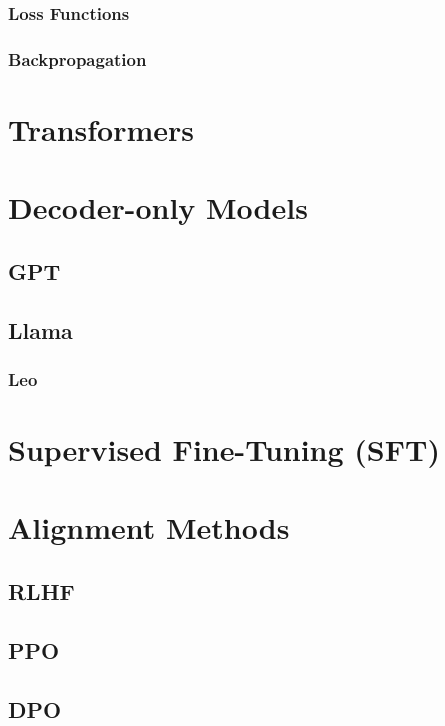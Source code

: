 \subsubsection{Loss Functions}

\subsubsection{Backpropagation}

\section{Transformers}\label{sec:trans}

\section{Decoder-only Models}\label{sec:decoder}

\subsection{GPT}\label{subsec:gpt}

\subsection{Llama}\label{subsec:llama}

\subsubsection{Leo}

\section{Supervised Fine-Tuning (SFT)}\label{sec:supervised-fine-tuning}

\section{Alignment Methods}\label{sec:alignment-methods}

\subsection{RLHF}\label{subsec:rlhf}
\subsection{PPO}\label{subsec:ppo}
\subsection{DPO}\label{subsec:dpo}

